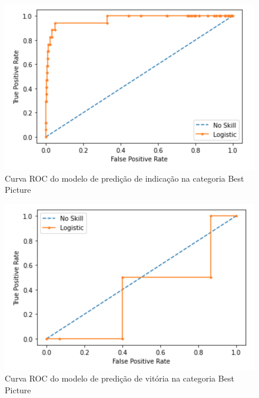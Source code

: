             \begin{figure}[htb]
            	\caption{\label{roc1}Curva ROC do modelo de predição de indicação na categoria Best Picture}
            	\begin{center}
            		\includegraphics[scale=0.7]{roc1.png}
            	\end{center}
            \end{figure}
            
            \begin{figure}[htb]
            	\caption{\label{roc2}Curva ROC do modelo de predição de vitória na categoria Best Picture}
            	\begin{center}
            		\includegraphics[scale=0.7]{roc2.png}
            	\end{center}
            \end{figure}
            
